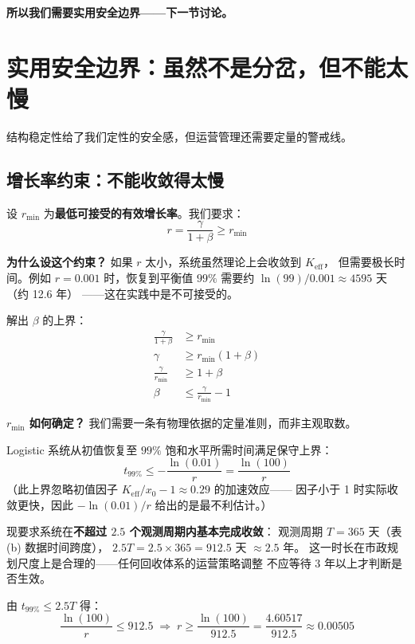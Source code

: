 \documentclass[12pt,a4paper]{article}
\begin{document}
\textbf{所以我们需要实用安全边界——下一节讨论。}

\section{实用安全边界：虽然不是分岔，但不能太慢}

结构稳定性给了我们定性的安全感，但运营管理还需要定量的警戒线。

\subsection{增长率约束：不能收敛得太慢}

设 $r_{\min}$ 为\textbf{最低可接受的有效增长率}。我们要求：
\[
r = \frac{\gamma}{1+\beta} \geq r_{\min}
\]

\textbf{为什么设这个约束？} 如果 $r$ 太小，系统虽然理论上会收敛到 $K_{\text{eff}}$，
但需要极长时间。例如 $r = 0.001$ 时，恢复到平衡值 $99\%$ 需要约 $\ln(99)/0.001 \approx 4595$ 天（约 12.6 年）
——这在实践中是不可接受的。

解出 $\beta$ 的上界：
\begin{align*}
\frac{\gamma}{1+\beta} &\geq r_{\min} \\[3pt]
\gamma &\geq r_{\min}(1+\beta) \\[3pt]
\frac{\gamma}{r_{\min}} &\geq 1+\beta \\[3pt]
\beta &\leq \frac{\gamma}{r_{\min}} - 1
\end{align*}

\textbf{$r_{\min}$ 如何确定？} 我们需要一条有物理依据的定量准则，而非主观取数。

Logistic 系统从初值恢复至 $99\%$ 饱和水平所需时间满足保守上界：
\[
t_{99\%} \leq -\frac{\ln(0.01)}{r} = \frac{\ln(100)}{r}
\]
（此上界忽略初值因子 $K_{\text{eff}}/x_0-1 \approx 0.29$ 的加速效应——
因子小于 1 时实际收敛更快，因此 $-\ln(0.01)/r$ 给出的是最不利估计。）

现要求系统在\textbf{不超过 $2.5$ 个观测周期内基本完成收敛}：
观测周期 $T = 365$ 天（表(b) 数据时间跨度），
$2.5T = 2.5 \times 365 = 912.5$ 天 $\approx 2.5$ 年。
这一时长在市政规划尺度上是合理的——任何回收体系的运营策略调整
不应等待 $3$ 年以上才判断是否生效。

由 $t_{99\%} \leq 2.5T$ 得：
\[
\frac{\ln(100)}{r} \leq 912.5
\;\Rightarrow\;
r \geq \frac{\ln(100)}{912.5} = \frac{4.60517}{912.5} \approx 0.00505
\]
\end{document}
